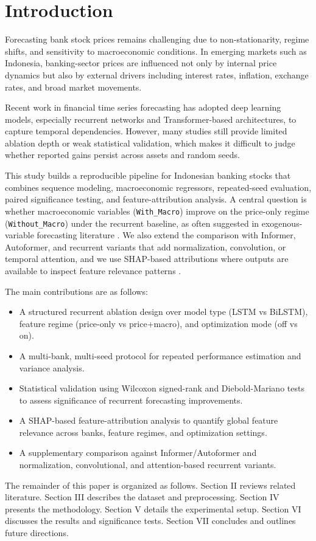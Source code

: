 \section{Introduction}
Forecasting bank stock prices remains challenging due to non-stationarity, regime shifts, and sensitivity to macroeconomic conditions. In emerging markets such as Indonesia, banking-sector prices are influenced not only by internal price dynamics but also by external drivers including interest rates, inflation, exchange rates, and broad market movements.

Recent work in financial time series forecasting has adopted deep learning models, especially recurrent networks and Transformer-based architectures, to capture temporal dependencies. However, many studies still provide limited ablation depth or weak statistical validation, which makes it difficult to judge whether reported gains persist across assets and random seeds.

This study builds a reproducible pipeline for Indonesian banking stocks that combines sequence modeling, macroeconomic regressors, repeated-seed evaluation, paired significance testing, and feature-attribution analysis. A central question is whether macroeconomic variables (\texttt{With\_Macro}) improve on the price-only regime (\texttt{Without\_Macro}) under the recurrent baseline, as often suggested in exogenous-variable forecasting literature \cite{wang2024timexer,adyatma2022idx_macro}. We also extend the comparison with Informer, Autoformer, and recurrent variants that add normalization, convolution, or temporal attention, and we use SHAP-based attributions where outputs are available to inspect feature relevance patterns \cite{lundberg2017shap}.

The main contributions are as follows:
\begin{itemize}
    \item A structured recurrent ablation design over model type (LSTM vs BiLSTM), feature regime (price-only vs price+macro), and optimization mode (off vs on).
    \item A multi-bank, multi-seed protocol for repeated performance estimation and variance analysis.
    \item Statistical validation using Wilcoxon signed-rank and Diebold-Mariano tests to assess significance of recurrent forecasting improvements.
    \item A SHAP-based feature-attribution analysis to quantify global feature relevance across banks, feature regimes, and optimization settings.
    \item A supplementary comparison against Informer/Autoformer and normalization, convolutional, and attention-based recurrent variants.
\end{itemize}

The remainder of this paper is organized as follows. Section II reviews related literature. Section III describes the dataset and preprocessing. Section IV presents the methodology. Section V details the experimental setup. Section VI discusses the results and significance tests. Section VII concludes and outlines future directions.
